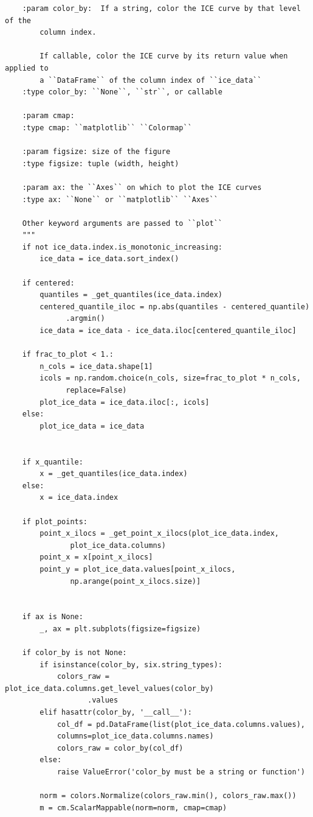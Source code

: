 \documentclass{article}
\begin{document}
\begin{lstlisting}
    :param color_by:  If a string, color the ICE curve by that level of the
        column index.

        If callable, color the ICE curve by its return value when applied to 
        a ``DataFrame`` of the column index of ``ice_data``
    :type color_by: ``None``, ``str``, or callable

    :param cmap:
    :type cmap: ``matplotlib`` ``Colormap``

    :param figsize: size of the figure
    :type figsize: tuple (width, height)
        
    :param ax: the ``Axes`` on which to plot the ICE curves
    :type ax: ``None`` or ``matplotlib`` ``Axes``

    Other keyword arguments are passed to ``plot``
    """
    if not ice_data.index.is_monotonic_increasing:
        ice_data = ice_data.sort_index()

    if centered:
        quantiles = _get_quantiles(ice_data.index)
        centered_quantile_iloc = np.abs(quantiles - centered_quantile)
              .argmin()
        ice_data = ice_data - ice_data.iloc[centered_quantile_iloc]

    if frac_to_plot < 1.:
        n_cols = ice_data.shape[1]
        icols = np.random.choice(n_cols, size=frac_to_plot * n_cols, 
              replace=False)
        plot_ice_data = ice_data.iloc[:, icols]
    else:
        plot_ice_data = ice_data


    if x_quantile:
        x = _get_quantiles(ice_data.index)
    else:
        x = ice_data.index

    if plot_points:
        point_x_ilocs = _get_point_x_ilocs(plot_ice_data.index, 
               plot_ice_data.columns)
        point_x = x[point_x_ilocs]
        point_y = plot_ice_data.values[point_x_ilocs, 
               np.arange(point_x_ilocs.size)]

        
    if ax is None:
        _, ax = plt.subplots(figsize=figsize)

    if color_by is not None:
        if isinstance(color_by, six.string_types):
            colors_raw = plot_ice_data.columns.get_level_values(color_by)
                   .values
        elif hasattr(color_by, '__call__'):
            col_df = pd.DataFrame(list(plot_ice_data.columns.values),
            columns=plot_ice_data.columns.names)
            colors_raw = color_by(col_df)
        else:
            raise ValueError('color_by must be a string or function')

        norm = colors.Normalize(colors_raw.min(), colors_raw.max())
        m = cm.ScalarMappable(norm=norm, cmap=cmap)


\end{lstlisting}
\end{document}
